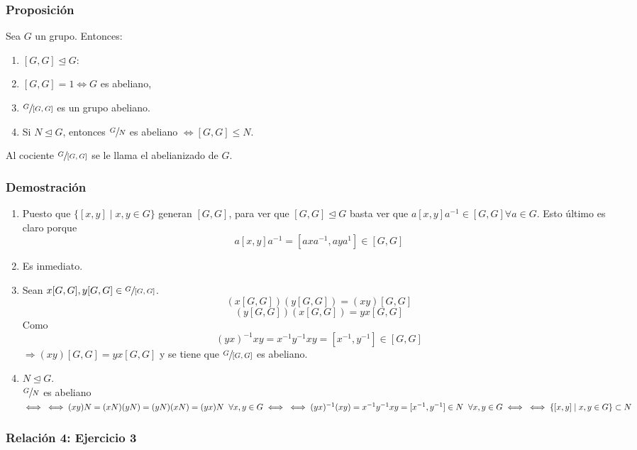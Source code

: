 \documentclass[11pt,a4paper]{article}
\begin{document}
\subsubsection*{Proposición}

Sea $G$ un grupo. Entonces:
\begin{enumerate}[label = (\arabic*)]
\item $[G, G] \unlhd G$:
\item $[G, G] = 1 \iff G$ es abeliano,
\item $\sfrac{G}{[G,G]}$ es un grupo abeliano.
\item Si $N \unlhd G$, entonces $\sfrac{G}{N}$ es abeliano $\iff [G,G] \leqslant N$.
\end{enumerate}

Al cociente $\sfrac{G}{[G,G]}$ se le llama el abelianizado de $G$.

\subsubsection*{Demostración}

\begin{enumerate}[label = (\arabic*)]
\item Puesto que $\{[x,y] \mid x,y \in G\}$ generan $[G,G]$, para ver que $[G,G] \unlhd G$ basta ver que $a[x,y]a^{-1} \in [G,G] \forall a \in G$. Esto último es claro porque
$$a[x,y]a^{-1} = [axa^{-1}, aya^{1}] \in [G,G]$$
\item Es inmediato.
\item Sean $x[G,G], y[G,G] \in \sfrac{G}{[G,G]}$.
$$(x[G,G])(y[G,G]) = (xy)[G,G]$$
$$(y[G,G])(x[G,G]) = yx[G,G]$$
Como
$$(yx)^{-1}xy = x^{-1}y^{-1}xy = [x^{-1}, y^{-1}] \in [G,G]$$
$\Rightarrow (xy) [G,G] = yx[G,G]$ y se tiene que $\sfrac{G}{[G,G]}$ es abeliano.
\item $N \unlhd G$. \\
$\sfrac{G}{N}$ es abeliano $\iff \\ \iff (xy)N = (xN) (yN) = (yN) (xN) = (yx) N \hspace{0.2cm} \forall x, y \in G \iff \\ \iff (yx)^{-1} (xy) = x^{-1} y^{-1} xy = [x^{-1}, y^{-1}] \in N \hspace{0.2cm} \forall x, y \in G \iff \\ \iff \{[x,y] \mid x, y \in G\} \subset N$
\end{enumerate}

\subsubsection*{Relación 4: Ejercicio 3}
\end{document}
